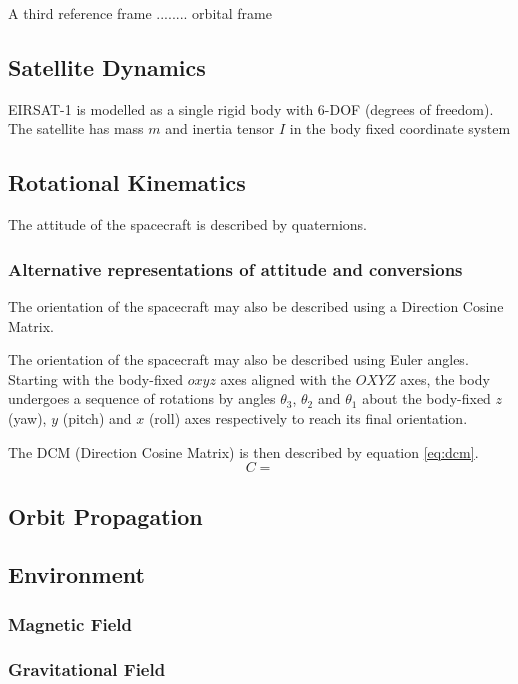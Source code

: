 A third reference frame ........  orbital frame

\subsection{Satellite Dynamics}

EIRSAT-1 is modelled as a single rigid body with 6-DOF (degrees of freedom).
The satellite has mass $m$ and inertia tensor $I$ in the body fixed coordinate system

\subsection{Rotational Kinematics}

The attitude of the spacecraft is described by quaternions.

\subsubsection{Alternative representations of attitude and conversions}
The orientation of the spacecraft may also be described using a Direction Cosine Matrix.

The orientation of the spacecraft may also be described using Euler angles.
Starting with the body-fixed $oxyz$ axes aligned with the $OXYZ$ axes, the body undergoes a sequence of rotations by angles $\theta_3$, $\theta_2$ and $\theta_1$ about the body-fixed $z$ (yaw), $y$ (pitch) and $x$ (roll) axes respectively to reach its final orientation.

The DCM (Direction Cosine Matrix) is then described by equation \ref{eq:dcm}.
\begin{equation} \label{eq:dcm}
C = 
\end{equation}

\subsection{Orbit Propagation}

\subsection{Environment}
\subsubsection{Magnetic Field}
\subsubsection{Gravitational Field}

